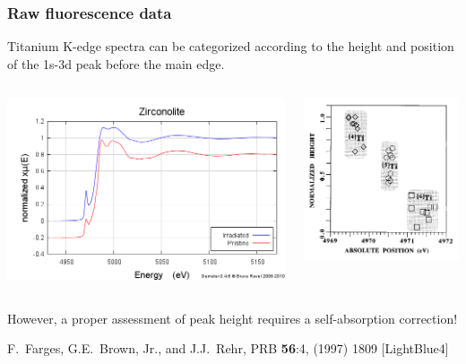 \documentclass[10pt, xcolor=x11names, compress]{beamer}
\begin{document}
\begin{frame}
  \frametitle{Raw fluorescence data}

  Titanium K-edge spectra can be categorized according to the height
  and position of the 1s-3d peak before the main edge.

  \begin{columns}
    \begin{column}{0.5\linewidth}
      \includegraphics[width=\linewidth]{images/pristine_irrad.png}
    \end{column}
    \begin{column}{0.5\linewidth}
      \begin{center}
        \includegraphics[width=0.8\linewidth]{images/farges.png}
      \end{center}
    \end{column}
  \end{columns}

  \smallskip

  However, a proper assessment of peak height requires a
  self-absorption correction!

  \begin{bottomnote}[0.5][19]
    F.~Farges, G.E.~Brown, Jr., and J.J.~Rehr, PRB \textbf{56}:4,
    (1997) 1809
    [LightBlue4]
  \end{bottomnote}
\end{frame}
\end{document}
